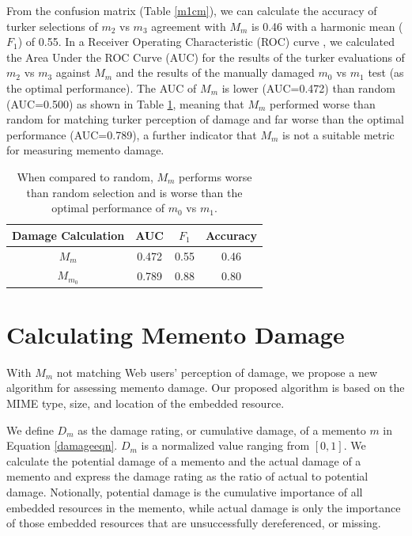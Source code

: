 From the confusion matrix (Table \ref{m1cm}), we can calculate the accuracy of turker selections of $m_2$ vs $m_3$ agreement with $M_m$ is 0.46 with a harmonic mean ($F_1$) of 0.55. In a Receiver Operating Characteristic (ROC) curve \cite{fawcett2006introduction}, we calculated the Area Under the ROC Curve (AUC) for the results of the turker evaluations of $m_2$ vs $m_3$ against $M_m$ and the results of the manually damaged $m_0$ vs $m_1$ test (as the optimal performance). The AUC of $M_m$ is lower (AUC=0.472) than random (AUC=0.500) as shown in Table \ref{auc1}, meaning that $M_m$ performed worse than random for matching turker perception of damage and far worse than the optimal performance (AUC=0.789), a further indicator that $M_m$ is not a suitable metric for measuring memento damage.


\begin{table}
\centering
\begin{tabular}{ c | c | c | c }
    Damage Calculation &  AUC & $F_1$ & Accuracy\\
\hline
  $M_m$ & 0.472 & 0.55 & 0.46\\
  $M_{m_0}$ & 0.789 & 0.88 & 0.80 \\
\hline
\end{tabular}
  \caption{When compared to random, $M_m$ performs worse than random selection and is worse than the optimal performance of $m_0$ vs $m_1$.}
  \label{auc1}
\end{table}




\section{Calculating Memento Damage}
\label{damage}
With $M_m$ not matching Web users' perception of damage, we propose a new algorithm for assessing memento damage. Our proposed algorithm is based on the MIME type, size, and location of the embedded resource.

We define $D_m$ as the damage rating, or cumulative damage, of a memento $m$ in Equation \ref{damageeqn}. $D_m$ is a normalized value ranging from $[0,1]$. We calculate the potential damage of a memento and the actual damage of a memento and express the damage rating as the ratio of actual to potential damage. Notionally, potential damage is the cumulative importance of all embedded resources in the memento, while actual damage is only the importance of those embedded resources that are unsuccessfully dereferenced, or missing.

